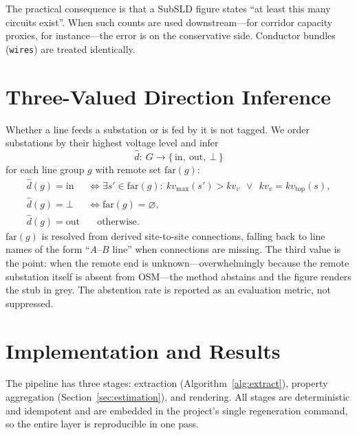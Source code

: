 \documentclass[journal]{IEEEtran}
\begin{document}
The practical consequence is that a SubSLD figure states ``at least this many
circuits exist''. When such counts are used downstream---for corridor capacity
proxies, for instance---the error is on the conservative side. Conductor bundles
(\texttt{wires}) are treated identically.

\section{Three-Valued Direction Inference}\label{sec:direction}

Whether a line feeds a substation or is fed by it is not tagged. We order
substations by their highest voltage level and infer
\begin{equation}
\hat{d}:\ G \longrightarrow \{\,\mathrm{in},\ \mathrm{out},\ \bot\,\}
\end{equation}
for each line group $g$ with remote set $\mathrm{far}(g)$:
\begin{align}
\hat{d}(g)=\mathrm{in} &\iff
\exists s'\!\in\!\mathrm{far}(g):\ kv_{\max}(s') > kv_v
\ \ \vee\ \ kv_v = kv_{\mathrm{top}}(s),\\
\hat{d}(g)=\bot &\iff \mathrm{far}(g)=\varnothing,\\
\hat{d}(g)=\mathrm{out} &\quad\text{otherwise}.
\end{align}
$\mathrm{far}(g)$ is resolved from derived site-to-site connections, falling back
to line names of the form ``$A$--$B$ line'' when connections are missing. The
third value is the point: when the remote end is unknown---overwhelmingly because
the remote substation itself is absent from OSM---the method abstains and the
figure renders the stub in grey. The abstention rate is reported as an evaluation
metric, not suppressed.

\section{Implementation and Results}\label{sec:results}

The pipeline has three stages: extraction (Algorithm~\ref{alg:extract}),
property aggregation (Section~\ref{sec:estimation}), and rendering. All stages
are deterministic and idempotent and are embedded in the project's single
regeneration command, so the entire layer is reproducible in one pass.
\end{document}
